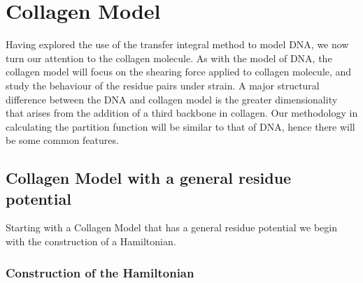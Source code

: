 \chapter{Collagen Model}

Having explored the use of the transfer integral method to model DNA, we now turn our attention to the collagen molecule. As with the model of DNA, the collagen model will focus on the shearing force applied to collagen molecule, and study the behaviour of the residue pairs under strain. A major structural difference between the DNA and collagen model is the greater dimensionality that arises from the addition of a third backbone in collagen. Our methodology in calculating the partition function will be similar to that of DNA, hence there will be some common features. 

\section{Collagen Model with a general residue potential}

Starting with a Collagen Model that has a general residue potential we begin with the construction of a Hamiltonian.

\subsection{Construction of the Hamiltonian}


